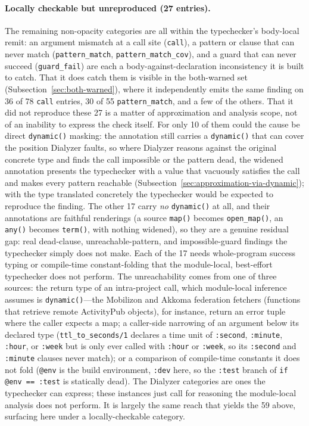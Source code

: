 \paragraph{Locally checkable but unreproduced (27 entries).}
The remaining non-opacity categories are all within the typechecker's body-local remit: an argument mismatch at a call site (\texttt{call}), a pattern or clause that can never match (\texttt{pattern\_match}, \texttt{pattern\_match\_cov}), and a guard that can never succeed (\texttt{guard\_fail}) are each a body-against-declaration inconsistency it is built to catch.
That it does catch them is visible in the both-warned set (Subsection~\ref{sec:both-warned}), where it independently emits the same finding on 36 of 78 \texttt{call} entries, 30 of 55 \texttt{pattern\_match}, and a few of the others.
That it did not reproduce these 27 is a matter of approximation and analysis scope, not of an inability to express the check itself.
For only 10 of them could the cause be direct \texttt{dynamic()} masking: the annotation still carries a \texttt{dynamic()} that can cover the position Dialyzer faults, so where Dialyzer reasons against the original concrete type and finds the call impossible or the pattern dead, the widened annotation presents the typechecker with a value that vacuously satisfies the call and makes every pattern reachable (Subsection~\ref{sec:approximation-via-dynamic}); with the type translated concretely the typechecker would be expected to reproduce the finding.
The other 17 carry \emph{no} \texttt{dynamic()} at all, and their annotations are faithful renderings (a source \texttt{map()} becomes \texttt{open\_map()}, an \texttt{any()} becomes \texttt{term()}, with nothing widened), so they are a genuine residual gap: real dead-clause, unreachable-pattern, and impossible-guard findings the typechecker simply does not make.
Each of the 17 needs whole-program success typing or compile-time constant-folding that the module-local, best-effort typechecker does not perform.
The unreachability comes from one of three sources: the return type of an intra-project call, which module-local inference assumes is \texttt{dynamic()}---the Mobilizon and Akkoma federation fetchers (functions that retrieve remote ActivityPub objects), for instance, return an error tuple where the caller expects a map; a caller-side narrowing of an argument below its declared type (\texttt{ttl\_to\_seconds/1} declares a time unit of \texttt{:second}, \texttt{:minute}, \texttt{:hour}, or \texttt{:week} but is only ever called with \texttt{:hour} or \texttt{:week}, so its \texttt{:second} and \texttt{:minute} clauses never match); or a comparison of compile-time constants it does not fold (\texttt{@env} is the build environment, \texttt{:dev} here, so the \texttt{:test} branch of \texttt{if @env == :test} is statically dead).
The Dialyzer categories are ones the typechecker can express; these instances just call for reasoning the module-local analysis does not perform. It is largely the same reach that yields the 59 above, surfacing here under a locally-checkable category.

